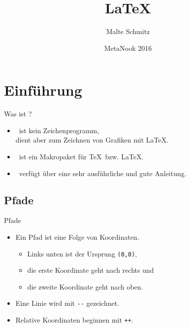 \documentclass[xcolor=table]{beamer}
\author{Malte Schmitz}
\title{LaTeX}
\date{MetaNook 2016}
\begin{document}



\section{Einführung}

\begin{frame}{Was ist \TikZ?}
  \begin{itemize}
    \item \TikZ\ ist kein Zeichenprogramm,\\
      dient aber zum Zeichnen von Grafiken mit \LaTeX.
    \item \TikZ\ ist ein Makropaket für \TeX\ bzw. \LaTeX.
    \item \TikZ\ verfügt über eine sehr ausführliche und gute Anleitung.
  \end{itemize}
\end{frame}

\subsection{Pfade}

\begin{frame}{Pfade}
  \begin{itemize}
    \item Ein Pfad ist eine Folge von Koordinaten.
      \begin{itemize}
        \item Links unten ist der Ursprung \lstinline-(0,0)-,
        \item die erste Koordinate geht nach rechts und
        \item die zweite Koordinate geht nach oben.
      \end{itemize}
    \item Eine Linie wird mit \lstinline|--| gezeichnet.
    \item Relative Koordinaten beginnen mit \lstinline-++-.
  \end{itemize}
\end{frame}
\end{document}

